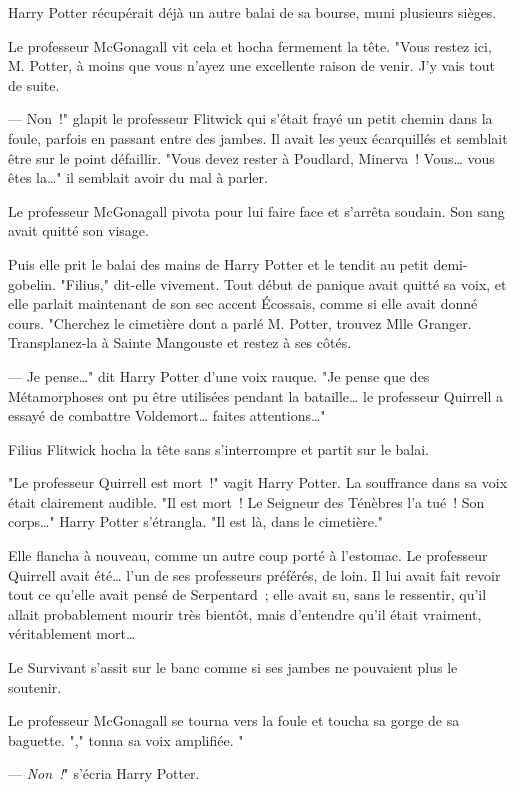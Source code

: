 Harry Potter récupérait déjà un autre balai de sa bourse, muni plusieurs sièges.

Le professeur McGonagall vit cela et hocha fermement la tête. "Vous restez ici, M. Potter, à moins que vous n'ayez une excellente raison de venir. J'y vais tout de suite.

--- Non~!" glapit le professeur Flitwick qui s'était frayé un petit chemin dans la foule, parfois en passant entre des jambes. Il avait les yeux écarquillés et semblait être sur le point défaillir. "Vous devez rester à Poudlard, Minerva~! Vous… vous êtes la…" il semblait avoir du mal à parler.

Le professeur McGonagall pivota pour lui faire face et s'arrêta soudain. Son sang avait quitté son visage.

Puis elle prit le balai des mains de Harry Potter et le tendit au petit demi-gobelin. "Filius," dit-elle vivement. Tout début de panique avait quitté sa voix, et elle parlait maintenant de son sec accent Écossais, comme si elle avait donné cours. "Cherchez le cimetière dont a parlé M. Potter, trouvez Mlle Granger. Transplanez-la à Sainte Mangouste et restez à ses côtés.

--- Je pense…" dit Harry Potter d'une voix rauque. "Je pense que des Métamorphoses ont pu être utilisées pendant la bataille… le professeur Quirrell a essayé de combattre Voldemort… faites attentions…"

Filius Flitwick hocha la tête sans s'interrompre et partit sur le balai.

"Le professeur Quirrell est mort~!" vagit Harry Potter. La souffrance dans sa voix était clairement audible. "Il est mort~! Le Seigneur des Ténèbres l'a tué~! Son corps…" Harry Potter s'étrangla. "Il est là, dans le cimetière."

Elle flancha à nouveau, comme un autre coup porté à l'estomac. Le professeur Quirrell avait été… l'un de ses professeurs préférés, de loin. Il lui avait fait revoir tout ce qu'elle avait pensé de Serpentard~; elle avait su, sans le ressentir, qu'il allait probablement mourir très bientôt, mais d'entendre qu'il était vraiment, véritablement mort…

Le Survivant s'assit sur le banc comme si ses jambes ne pouvaient plus le soutenir.

Le professeur McGonagall se tourna vers la foule et toucha sa gorge de sa baguette. "," tonna sa voix amplifiée. "

--- \emph{Non~!}" s'écria Harry Potter.

